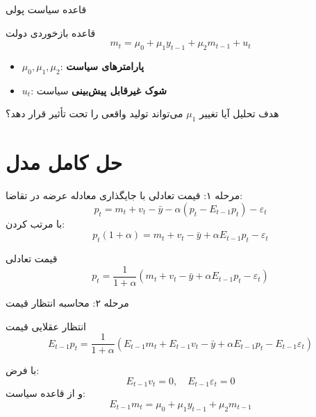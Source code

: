 \documentclass[aspectratio=169,11pt]{beamer}
\newcommand{\highlight}[1]{\textcolor{AccentOrange}{\textbf{#1}}}
\newcommand{\keyword}[1]{\textcolor{MainBlue}{\textbf{#1}}}
\begin{document}
\begin{frame}{قاعده سیاست پولی}
	\begin{block}{قاعده بازخوردی دولت}
		\centering
		\large
		\[
			m_t = \mu_0 + \mu_1 y_{t-1} + \mu_2 m_{t-1} + u_t
		\]
	\end{block}
	\vspace{0.3cm}
	\begin{itemize}
		\item $\mu_0, \mu_1, \mu_2$: \keyword{پارامترهای سیاست}
		\item $u_t$: \highlight{شوک غیرقابل پیش‌بینی} سیاست
	\end{itemize}
	\vspace{0.3cm}
	\begin{alertblock}{هدف تحلیل}
		آیا تغییر $\mu_1$ می‌تواند تولید واقعی را تحت تأثیر قرار دهد؟
	\end{alertblock}
\end{frame}

\section{حل کامل مدل}

\begin{frame}{مرحله ۱: قیمت تعادلی}
	با جایگذاری معادله عرضه در تقاضا:
	\[
		p_t = m_t + v_t - \bar{y} - \alpha(p_t - E_{t-1}p_t) - \varepsilon_t
	\]
	\vspace{0.3cm}
	با مرتب کردن:
	\[
		p_t (1 + \alpha) = m_t + v_t - \bar{y} + \alpha E_{t-1}p_t - \varepsilon_t
	\]
	\vspace{0.3cm}
	\begin{block}{قیمت تعادلی}
		\centering
		\[
			p_t = \frac{1}{1+\alpha}\left(m_t + v_t - \bar{y} + \alpha E_{t-1}p_t - \varepsilon_t\right)
		\]
	\end{block}
\end{frame}

\begin{frame}{مرحله ۲: محاسبه انتظار قیمت}
	\begin{block}{انتظار عقلایی قیمت}
		\[
			E_{t-1}p_t = \frac{1}{1+\alpha}\left(E_{t-1}m_t + E_{t-1}v_t - \bar{y} + \alpha E_{t-1}p_t - E_{t-1}\varepsilon_t\right)
		\]
	\end{block}
	\vspace{0.3cm}
	با فرض:
	\[
		E_{t-1}v_t = 0, \quad E_{t-1}\varepsilon_t = 0
	\]
	و از قاعده سیاست:
	\[
		E_{t-1}m_t = \mu_0 + \mu_1 y_{t-1} + \mu_2 m_{t-1}
	\]
\end{frame}
\end{document}
